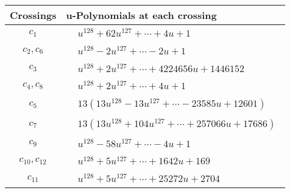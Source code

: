 \documentclass[1p]{elsarticle_modified}
\theoremstyle{definition}
\begin{document}
\begin{tabular}{m{50pt}|m{274pt}}
Crossings & \hspace{64pt}u-Polynomials at each crossing \\
\hline $$\begin{aligned}c_{1}\end{aligned}$$&$\begin{aligned}
&u^{128}+62 u^{127}+\cdots+4 u+1
\end{aligned}$\\
\hline $$\begin{aligned}c_{2},c_{6}\end{aligned}$$&$\begin{aligned}
&u^{128}-2 u^{127}+\cdots-2 u+1
\end{aligned}$\\
\hline $$\begin{aligned}c_{3}\end{aligned}$$&$\begin{aligned}
&u^{128}+2 u^{127}+\cdots+4224656 u+1446152
\end{aligned}$\\
\hline $$\begin{aligned}c_{4},c_{8}\end{aligned}$$&$\begin{aligned}
&u^{128}+2 u^{127}+\cdots+4 u+1
\end{aligned}$\\
\hline $$\begin{aligned}c_{5}\end{aligned}$$&$\begin{aligned}
&13(13 u^{128}-13 u^{127}+\cdots-23585 u+12601)
\end{aligned}$\\
\hline $$\begin{aligned}c_{7}\end{aligned}$$&$\begin{aligned}
&13(13 u^{128}+104 u^{127}+\cdots+257066 u+17686)
\end{aligned}$\\
\hline $$\begin{aligned}c_{9}\end{aligned}$$&$\begin{aligned}
&u^{128}-58 u^{127}+\cdots-4 u+1
\end{aligned}$\\
\hline $$\begin{aligned}c_{10},c_{12}\end{aligned}$$&$\begin{aligned}
&u^{128}+5 u^{127}+\cdots+1642 u+169
\end{aligned}$\\
\hline $$\begin{aligned}c_{11}\end{aligned}$$&$\begin{aligned}
&u^{128}+5 u^{127}+\cdots+25272 u+2704
\end{aligned}$\\
\hline
\end{tabular}\\~\\
\end{document}
